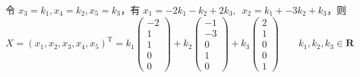 \begin{enumerate}
          令 $ x_3 = k_1, x_4 = k_2, x_5 = k_3$，有 $x_1 = -2k_1 - k_2 + 2k_3,\enspace\allowbreak x_2 = k_1 + -3k_2 + k_3 $，则
          \[ X = (x_1, x_2, x_3, x_4, x_5)^\mathrm{T} = k_1 \begin{pmatrix} -2 \\ 1 \\ 1 \\ 0 \\ 0 \end{pmatrix} + k_2 \begin{pmatrix} -1 \\ -3 \\ 0 \\ 1 \\ 0 \end{pmatrix} + k_3 \begin{pmatrix} 2 \\ 1 \\ 0 \\ 0 \\ 1 \end{pmatrix} \qquad k_1, k_2, k_3 \in \mathbf{R} \]


\end{enumerate}
